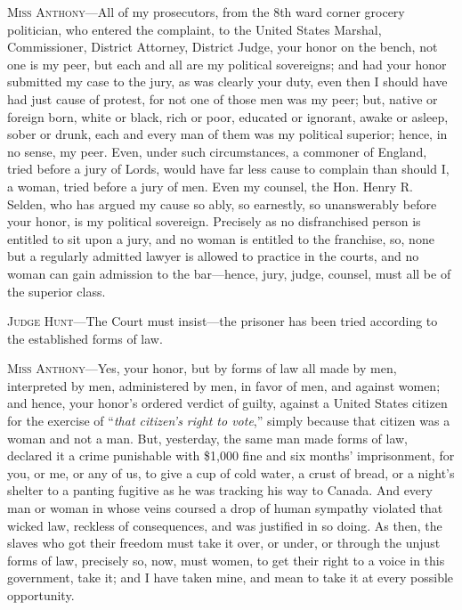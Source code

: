 \textsc{Miss Anthony}---All of my prosecutors, from the 8th
ward corner grocery politician, who entered the complaint, to the
United States Marshal, Commissioner, District Attorney, District
Judge, your honor on the bench, not one is my peer, but each and all
are my political sovereigns; and had your honor submitted my case to
the jury, as was clearly your duty, even then I should have had just
cause of protest, for not one of those men was my peer; but, native or
foreign born, white or black, rich or poor, educated or ignorant,
awake or asleep, sober or drunk, each and every man of them was my
political superior; hence, in no sense, my peer. Even, under such
circumstances, a commoner of England, tried before a jury of Lords,
would have far less cause to complain than should I, a woman, tried
before a jury of men. Even my counsel, the Hon. Henry R. Selden, who
has argued my cause so ably, so earnestly, so unanswerably before your
honor, is my political sovereign. Precisely as no disfranchised person
is entitled to sit upon a jury, and no woman is entitled to the
franchise, so, none but a regularly admitted lawyer is allowed to
practice in the courts, and no woman can gain admission to the
bar---hence, jury, judge, counsel, must all be of the superior class.

\textsc{Judge Hunt}---The Court must insist---the prisoner has been
tried according to the established forms of law.

\textsc{Miss Anthony}---Yes, your honor, but by forms of law all made
by men, interpreted by men, administered by men, in favor of men, and
against women; and hence, your honor's ordered verdict of guilty,
against a United States citizen for the exercise of ``\textit{that
citizen's right to vote},'' simply because that citizen was a woman
and not a man. But, yesterday, the same man made forms of law,
declared it a crime punishable with \$1,000 fine and six months'
imprisonment, for you, or me, or any of us, to give a cup of cold
water, a crust  of bread, or a night's shelter to a panting
fugitive as he was tracking his way to Canada. And every man or woman
in whose veins coursed a drop of human sympathy violated that wicked
law, reckless of consequences, and was justified in so doing. As
then, the slaves who got their freedom must take it over, or under, or
through the unjust forms of law, precisely so, now, must women, to get
their right to a voice in this government, take it; and I have taken
mine, and mean to take it at every possible opportunity.

